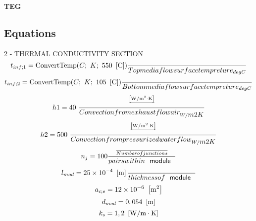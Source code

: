 \documentclass[10pt,fleqn]{article}
\newcommand{\KS}[1]{\mbox{\sf\ \ #1\ \ \mit}}
\newcommand{\V}[1]{\mbox{$ #1 $}}
\begin{document}
\begin{center}
\bf \mbox{TEG}
\vspace{0.2 in}
\end{center}
\subsection*{Equations}

\vspace{0.04in}
\noindent
{\color{blue} \rm 2 - THERMAL CONDUCTIVITY SECTION}
\begin{equation}
\label{EES Eqn:1}
t_{inf;1} = \mbox{ConvertTemp}{ \left( C;\ K;\ 550  \   \left[ \rm C \right] \right) } \frac {}{ Top media flow surface tempreture _{degC} } 
\end{equation}
{\color{blue} \rm}
\begin{equation}
\label{EES Eqn:2}
t_{inf;2} = \mbox{ConvertTemp}{ \left( C;\ K;\ 105  \   \left[ \rm C \right] \right) }  \frac {}{ Bottom media flow surface tempreture _{degC} } 
\end{equation}
{\color{blue} \rm}
\begin{equation}
\label{EES Eqn:3}
\V{h1}  = 40        \   \frac {\frac {\left[ \rm W/m^{2}\cdot K \right]}{  }}{ Convection from exhaust flow air  _{W/\V{m2K}} } 
\end{equation}
{\color{blue} \rm}
\begin{equation}
\label{EES Eqn:4}
\V{h2}  = 500      \   \frac {\frac {\left[ \rm W/m^{2}\cdot K \right]}{  }}{ Convection from pressurized water flow _{W/\V{m2K}} } 
\end{equation}
{\color{blue} \rm}
\begin{equation}
\label{EES Eqn:5}
n_{j} = 100              \frac {\frac {}{ Number of junctions }}{ pairs within \KS{module} } 
\end{equation}
\begin{equation}
\label{EES Eqn:6}
l_{mod} = 25\times 10^{-4}   \   \left[ \rm m \right]     \frac {}{ thickness of \KS{module} } 
\end{equation}
{\color{blue} \rm}
\begin{equation}
\label{EES Eqn:7}
a_{c;s} = 12\times 10^{-6}    \   \left[ \rm m^{2} \right] 
\end{equation}
{\color{blue} \rm}
\begin{equation}
\label{EES Eqn:8}
d_{mod} = 0,054      \   \left[ \rm m \right] 
\end{equation}
{\color{blue} \rm}
\begin{equation}
\label{EES Eqn:9}
k_{s} = 1,2      \   \left[ \rm W/m\cdot K \right] 
\end{equation}
\end{document}
